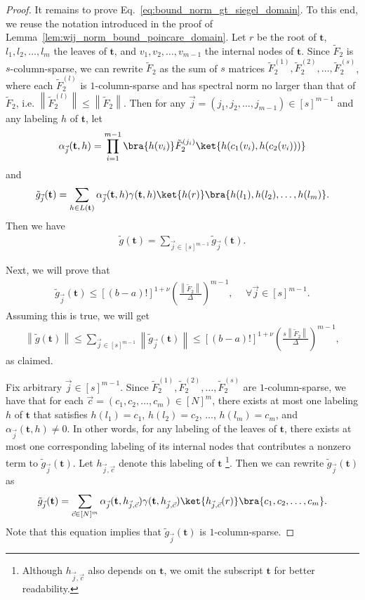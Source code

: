 \documentclass[superscriptaddress,onecolumn,nofootinbib,longbibliography,a4paper,accepted=2026-09-29]{quantumarticle}
\theoremstyle{plain}
\theoremstyle{definition}
\numberwithin{thm}{section}
\numberwithin{assumption}{section}
\numberwithin{lemma}{section}
\numberwithin{prop}{section}
\numberwithin{cor}{section}
\numberwithin{definition}{section}
\numberwithin{rmk}{section}
\numberwithin{equation}{section}
\newcommand{\norm}[1]     {\left\| #1 \right\|}
\newcommand{\lrb}[1]{\left ( #1 \right )}
\newcommand{\mbt}{\mathbf{t}}
\begin{document}
\begin{proof}
It remains to prove Eq.~\eqref{eq:bound_norm_gt_siegel_domain}. To this end, we reuse the notation introduced in the proof of Lemma~\ref{lem:wij_norm_bound_poincare_domain}. Let $r$ be the root of $\mbt$, $l_1, l_2, \dots, l_m$ the leaves of $\mbt$, and 
$v_1,v_2,\dots,v_{m-1}$ the internal nodes of $\mbt$. Since $\tilde{F}_2$ is $s$-column-sparse, we can rewrite $\tilde{F}_2$ as the sum of $s$ matrices $\tilde{F}_2^{(1)}, \tilde{F}_2^{(2)}, \dots, \tilde{F}_2^{(s)}$, where each $\tilde{F}_2^{(l)}$ is $1$-column-sparse and has spectral norm no larger than that of  $\tilde{F}_2$, i.e. $\norm{\tilde{F}_2^{(l)}} \le \norm{\tilde{F}_2}$. Then for any $\vec{j}=(j_1,j_2,\dots,j_{m-1}) \in [s]^{m-1}$ and any labeling $h$ of $\mbt$, let
\begin{align}
\alpha_{\vec j}(\mbt, h) = \prod_{i=1}^{m-1} \bra{h(v_i)} \tilde{F}_2^{(j_i)} \ket{h(c_1(v_i), h(c_2(v_i)))}
\end{align}
and
\begin{align}
\tilde{g}_{\vec j}(\mbt) = \sum_{h \in L(\mbt)} \alpha_{\vec j}(\mbt, h) \gamma(\mbt, h) 
\ket{h(r)}\bra{h(l_1), h(l_2),\dots, h(l_m)}.
\end{align}
Then we have
\begin{align}
    \tilde{g}(\mbt)=\sum_{\vec j \in [s]^{m-1}} \tilde{g}_{\vec j}(\mbt).
\end{align}

Next, we will prove that 
\begin{align}
\tilde{g}_{\vec j}(\mbt) \le [(b-a)!]^{1+\nu}\lrb{\frac{\norm{\tilde{F}_2}}{\Delta}}^{m-1},~&~\forall \vec j \in [s]^{m-1}.    
\end{align}
Assuming this is true, we will get 
\begin{align}
    \norm{\tilde{g}(\mbt)}\le \sum_{\vec j \in [s]^{m-1}} \norm{\tilde{g}_{\vec j}(\mbt)} 
    \le [(b-a)!]^{1+\nu}\lrb{\frac{s\norm{\tilde{F}_2}}{\Delta}}^{m-1},
\end{align}
as claimed.

Fix arbitrary $\vec j \in [s]^{m-1}$. Since $\tilde{F}_2^{(1)}, \tilde{F}_2^{(2)}, \dots, \tilde{F}_2^{(s)}$ are $1$-column-sparse, we have that for each $\vec c= (c_1,c_2,\dots,c_m) \in [N]^m$, there exists at most one labeling $h$ of $\mbt$ that satisfies $h(l_1)=c_1$, $h(l_2)=c_2$, $\dots$, $h(l_m)=c_m$, and 
$\alpha_{\vec j}(\mbt, h) \neq 0$. In other words, for any labeling of the leaves of $\mbt$, there exists at most one corresponding labeling of its internal nodes that contributes a nonzero term to $\tilde{g}_{\vec j}(\mbt)$. Let $h_{\vec j, \vec c}$ denote this labeling of $\mbt$ \footnote{Although $h_{\vec j, \vec c}$ also depends on $\mbt$, we omit the subscript $\mbt$ for better readability.}. Then we can rewrite $\tilde{g}_{\vec j}(\mbt)$ as 
\begin{align}
    \tilde{g}_{\vec j}(\mbt) = \sum_{\vec c \in [N]^m} \alpha_{\vec j}(\mbt, h_{\vec j, \vec c}) \gamma(\mbt, h_{\vec j, \vec c}) \ket{h_{\vec j, \vec c}(r)}\bra{c_1,c_2,\dots,c_m}.
\end{align}
Note that this equation implies that $\tilde{g}_{\vec j}(\mbt)$ is $1$-column-sparse. 


\end{proof}
\end{document}
